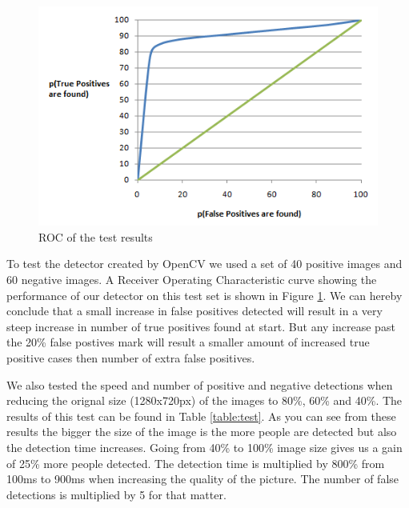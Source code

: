 \documentclass{article}
\begin{document}
\begin{figure}[h!]
	\centering
	\includegraphics[scale=0.68]{roc.png}
	\caption{ROC of the test results}
	\label{fig:roc}
\end{figure}

To test the detector created by OpenCV we used a set of 40 positive images and 60 negative images. A Receiver Operating Characteristic curve showing the performance of our detector on this test set is shown in Figure \ref{fig:roc}. We can hereby conclude that a small increase in false positives detected will result in a very steep increase in number of true positives found at start. But any increase past the 20\% false postives mark will result a smaller amount of increased true positive cases then number of extra false positives.

We also tested the speed and number of positive and negative detections when reducing the orignal size (1280x720px) of the images to 80\%, 60\% and 40\%. The results of this test can be found in Table \ref{table:test}. As you can see from these results the bigger the size of the image is the more people are detected but also the detection time increases. Going from 40\% to 100\% image size gives us a gain of 25\% more people detected. The detection time is multiplied by 800\% from 100ms to 900ms when increasing the quality of the picture. The number of false detections is multiplied by 5 for that matter.

\begin{table}[h!]
\centering
{}
\caption{Test results when resizing the image}
\label{table:test}
\end{table}
\end{document}
